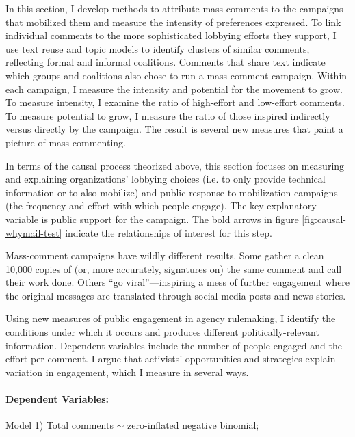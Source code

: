 In this section, I develop methods to attribute mass comments to the campaigns that mobilized them and measure the intensity of preferences expressed. 
To link individual comments to the more sophisticated lobbying efforts they support, I use text reuse and topic models to identify clusters of similar comments, reflecting formal and informal coalitions. Comments that share text indicate which groups and coalitions also chose to run a mass comment campaign. Within each campaign, I measure the intensity and potential for the movement to grow. To measure intensity, I examine the ratio of high-effort and low-effort comments. To measure potential to grow, I measure the ratio of those inspired indirectly versus directly by the campaign.
The result is several new measures that paint a picture of mass commenting.  

In terms of the causal process theorized above, this section focuses on measuring and explaining organizations' lobbying choices (i.e. to only provide technical information or to also mobilize) and public response to mobilization campaigns (the frequency and effort with which people engage). The key explanatory variable is public support for the campaign. The bold arrows in figure \ref{fig:causal-whymail-test} indicate the relationships of interest for this step.




Mass-comment campaigns have wildly different results. Some gather a clean 10,000 copies of (or, more accurately, signatures on) the same comment and call their work done. Others ``go viral''---inspiring a mess of further engagement where the original messages are translated through social media posts and news stories.

Using new measures of public engagement in agency rulemaking, I identify the conditions under which it occurs and produces different politically-relevant information. 
Dependent variables include the number of people engaged and the effort per comment.
I argue that activists' opportunities and strategies explain variation in engagement, which I measure in several ways. 

\paragraph{Dependent Variables:} 

Model 1) Total comments $\sim$ zero-inflated negative binomial; 

